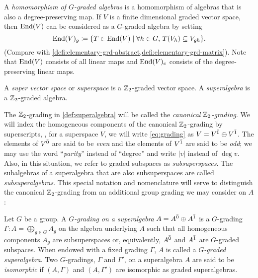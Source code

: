 A \emph{homomorphism of $G$-graded algebras} is a homomorphism of algebras that is also a degree-preserving map. 
If $V$ is a finite dimensional graded vector space, then $\operatorname{End}(V)$ can be considered as a $G$-graded algebra by setting 
\[\label{eq:elementary-1st}
    \operatorname{End}(V)_g \coloneqq \{ T\in \operatorname{End}(V) \mid \forall h\in G,\, T(V_h) \subseteq V_{gh} \}.
\]
(Compare with \cref{defi:elementary-grd-abstract,defi:elementary-grd-matrix}).
Note that $\operatorname{End}(V)$ consists of all linear maps and $\operatorname{End}(V)_e$ consists of the degree-preserving linear maps.





\begin{defi}\label{def:superalgebra}
    A \emph{super vector space} or \emph{superspace} is a $\mathbb{Z}_2$-graded vector space. 
    A \emph{superalgebra} is a $\mathbb{Z}_2$-graded algebra. 
\end{defi}

The $\mathbb{Z}_2$-grading in \cref{def:superalgebra} will be called the \emph{canonical $\mathbb{Z}_2$-grading}.
We will index the homogeneous components of the canonical $\mathbb{Z}_2$-grading by superscripts, \ie, for a superspace $V$, we will write \cref{eq:grading} as $V = V^{\bar0} \oplus V^{\bar1}$. 
The elements of $V^{\bar0}$ are said to be \emph{even} and the elements of $V^{\bar1}$ are said to be \emph{odd}; we may use the word ``\emph{parity}'' instead of ``degree'' and write $|v|$ instead of $\deg v$. 
Also, in this situation, we refer to graded subspaces as \emph{subsuperspaces}. 
The subalgebras of a superalgebra that are also subsuperspaces are called \emph{subsuperalgebras}. 
This special notation and nomenclature will serve to distinguish the canonical $\mathbb{Z}_2$-grading from an additional group grading we may consider on $A$:  

\begin{defi}\label{defi:grd-sa}
    Let $G$ be a group. 
    A \emph{$G$-grading on a superalgebra} $A = A^{\bar0} \oplus A^{\bar1}$ is a $G$-grading $\Gamma: A = \bigoplus_{g\in G} A_g$ on the algebra underlying $A$ such that all homogeneous components $A_g$ are subsuperspaces or, equivalently, $A^{\bar0}$ and $A^{\bar1}$ are $G$-graded subspaces. 
    When endowed with a fixed grading $\Gamma$, $A$ is called a \emph{$G$-graded superalgebra}. 
    Two $G$-gradings, $\Gamma$ and $\Gamma'$, on a superalgebra $A$ are said to be \emph{isomorphic} if $(A, \Gamma)$ and $(A, \Gamma')$ are isomorphic as graded superalgebras. 
\end{defi}

